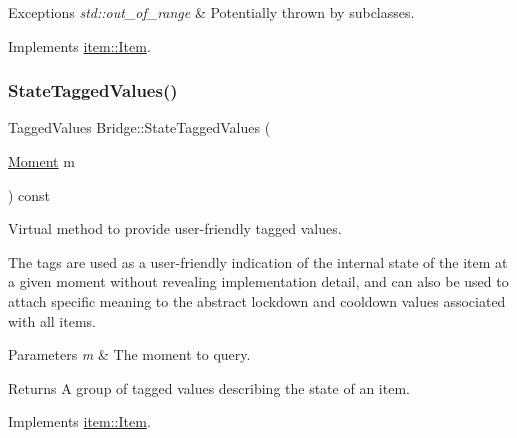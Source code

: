 \begin{DoxyExceptions}{Exceptions}
{\em std\+::out\+\_\+of\+\_\+range} & Potentially thrown by subclasses. \\
\hline
\end{DoxyExceptions}


Implements \hyperlink{classitem_1_1_item_a7d2b010a27fec55e04a56e7c4fca7837}{item\+::\+Item}.

\mbox{\label{classitem_1_1_bridge_a6339e1cd46f454625ef7cd6dc683f6cd}} 
\subsubsection{\texorpdfstring{State\+Tagged\+Values()}{StateTaggedValues()}}
{\footnotesize\ttfamily Tagged\+Values Bridge\+::\+State\+Tagged\+Values (\begin{DoxyParamCaption}\item[{\hyperlink{classtimeplane_1_1_moment}{Moment}}]{m }\end{DoxyParamCaption}) const\hspace{0.3cm}{\ttfamily [virtual]}}



Virtual method to provide user-\/friendly tagged values. 

The tags are used as a user-\/friendly indication of the internal state of the item at a given moment without revealing implementation detail, and can also be used to attach specific meaning to the abstract lockdown and cooldown values associated with all items. 
\begin{DoxyParams}{Parameters}
{\em m} & The moment to query. \\
\hline
\end{DoxyParams}
\begin{DoxyReturn}{Returns}
A group of tagged values describing the state of an item. 
\end{DoxyReturn}


Implements \hyperlink{classitem_1_1_item_a8410ab3ab75e65360eddb4f6bd3cceff}{item\+::\+Item}.

\mbox{\label{classitem_1_1_bridge_a08aa3fdb36e203e489bc0af65dde451c}} 

